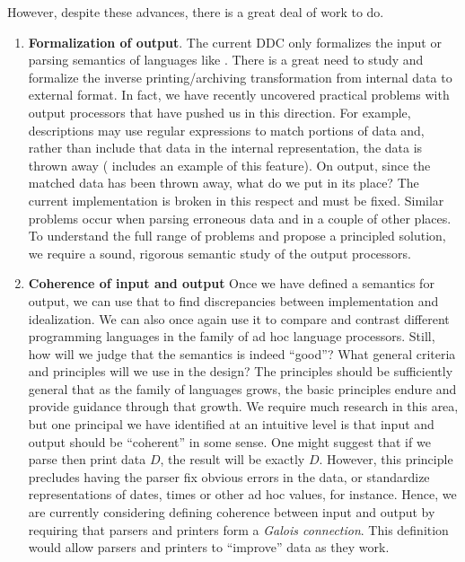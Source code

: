 However, despite these advances, there is a great deal of work to do.

\begin{enumerate}
\item {\bf Formalization of output}.  The current DDC only formalizes the
input or parsing semantics of languages like \pads.  There is
a great need to study and formalize the inverse printing/archiving 
transformation from internal data to external format.  In fact, 
we have recently
uncovered practical problems with output processors that have pushed us in 
this direction. For example, \pads{} descriptions may use regular expressions
to match portions of data and, rather than include that data in the
internal representation, the data is thrown away (
includes an example of this feature).  On output, since the matched
data has been thrown away, what do we put in its place?  The 
current implementation is broken in this respect and must be fixed.
Similar problems occur when parsing erroneous data and in a couple of other
places.  To understand the full range of problems and propose
a principled solution, we require a sound, rigorous semantic study
of the output processors.

\item {\bf Coherence of input and output}  Once we have defined a semantics
for output, we can use that to find discrepancies between implementation
and idealization.  We can also once again
use it to compare and contrast different programming languages
in the family of ad hoc language processors.  Still, 
how will we judge that the semantics is indeed ``good''?
What general criteria and principles will we use in the design?  The
principles should be sufficiently general that as the family of languages
grows, the basic principles endure and provide guidance through that 
growth.  We require much research in this area, but one principal
we have identified at an intuitive level is that input and output
should be ``coherent'' in some sense.  One might suggest that 
if we parse then print data $D$, the result will be exactly $D$.
However, this principle precludes having the parser fix obvious errors
in the data, or standardize representations of dates, times or other
ad hoc values, for instance.  Hence, we are currently considering
defining coherence between input and output
by requiring that parsers and printers form
a {\em Galois connection}.  This definition would allow parsers and printers to
``improve'' data as they work.  


\end{enumerate}
